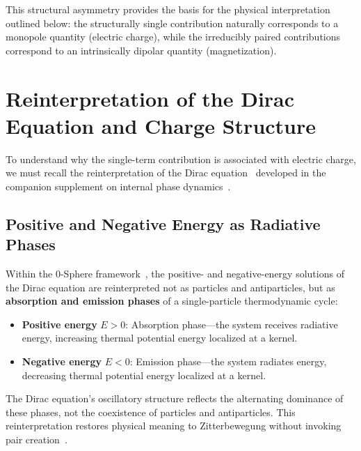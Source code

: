 \documentclass[12pt,letterpaper]{article}
\begin{document}
This structural asymmetry provides the basis for the physical interpretation outlined below: the structurally single contribution naturally corresponds to a monopole quantity (electric charge), while the irreducibly paired contributions correspond to an intrinsically dipolar quantity (magnetization).

\section{Reinterpretation of the Dirac Equation and Charge Structure}

To understand why the single-term contribution is associated with electric charge, we must recall the reinterpretation of the Dirac equation~\cite{Dirac1928} developed in the companion supplement on internal phase dynamics~\cite{hanamura17760132}.

\subsection{Positive and Negative Energy as Radiative Phases}

Within the 0-Sphere framework~\cite{hanamura17760132}, the positive- and negative-energy solutions of the Dirac equation are reinterpreted not as particles and antiparticles, but as \textbf{absorption and emission phases} of a single-particle thermodynamic cycle:
\begin{itemize}
\item \textbf{Positive energy} $E > 0$: Absorption phase---the system receives radiative energy, increasing thermal potential energy localized at a kernel.
\item \textbf{Negative energy} $E < 0$: Emission phase---the system radiates energy, decreasing thermal potential energy localized at a kernel.
\end{itemize}

The Dirac equation's oscillatory structure reflects the alternating dominance of these phases, not the coexistence of particles and antiparticles. This reinterpretation restores physical meaning to Zitterbewegung without invoking pair creation~\cite{hanamura18356895}.

\end{document}
